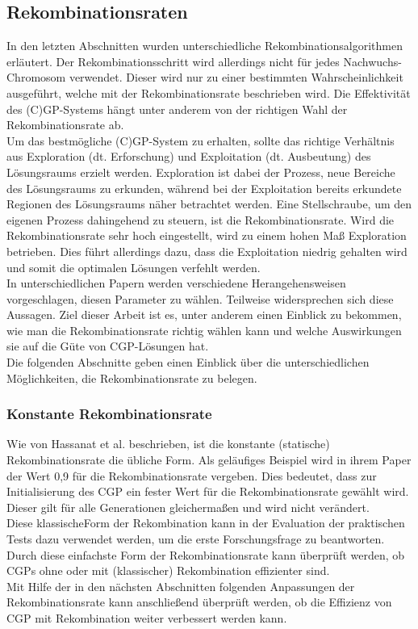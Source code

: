 \subsection{Rekombinationsraten}

In den letzten Abschnitten wurden unterschiedliche Rekombinationsalgorithmen erläutert.
Der Rekombinationsschritt wird allerdings nicht für jedes Nachwuchs-Chromosom verwendet.
Dieser wird nur zu einer bestimmten Wahrscheinlichkeit ausgeführt, welche mit der Rekombinationsrate beschrieben wird.
Die Effektivität des (C)GP-Systems hängt unter anderem von der richtigen Wahl der Rekombinationsrate ab. \cite{hassanat_choosing_2019}\\
Um das bestmögliche (C)GP-System zu erhalten, sollte das richtige Verhältnis aus Exploration (dt. Erforschung) und Exploitation (dt. Ausbeutung) des Lösungsraums erzielt werden. 
Exploration ist dabei der Prozess, neue Bereiche des Lösungsraums zu erkunden, während bei der Exploitation bereits erkundete Regionen des Lösungsraums näher betrachtet werden.
Eine Stellschraube, um den eigenen Prozess dahingehend zu steuern, ist die Rekombinationsrate. \cite{crepinsek_exploration_2013}
Wird die Rekombinationsrate sehr hoch eingestellt, wird zu einem hohen Maß Exploration betrieben. 
Dies führt allerdings dazu, dass die Exploitation niedrig gehalten wird und somit die optimalen Lösungen verfehlt werden. \cite{pavai_survey_2017}\\
In unterschiedlichen Papern werden verschiedene Herangehensweisen vorgeschlagen, diesen Parameter zu wählen.
Teilweise widersprechen sich diese Aussagen.
Ziel dieser Arbeit ist es, unter anderem einen Einblick zu bekommen, wie man die Rekombinationsrate richtig wählen kann und welche Auswirkungen sie auf die Güte von CGP-Lösungen hat.\\

Die folgenden Abschnitte geben einen Einblick über die unterschiedlichen Möglichkeiten, die Rekombinationsrate zu belegen.

\subsubsection{Konstante Rekombinationsrate}
\label{subsubsec:konstanteCrossover}

Wie von Hassanat et al. beschrieben, ist die konstante (statische) Rekombinationsrate die übliche Form. 
Als geläufiges Beispiel wird in ihrem Paper der Wert 0,9 für die Rekombinationsrate vergeben. \cite{hassanat_choosing_2019} 
Dies bedeutet, dass zur Initialisierung des CGP ein fester Wert für die Rekombinationsrate gewählt wird.
Dieser gilt für alle Generationen gleichermaßen und wird nicht verändert.\\
Diese \glqq klassische\grqq Form der Rekombination kann in der Evaluation der praktischen Tests dazu verwendet werden, um die erste Forschungsfrage zu beantworten.
Durch diese einfachste Form der Rekombinationsrate kann überprüft werden, ob CGPs ohne oder mit (klassischer) Rekombination effizienter sind.\\
Mit Hilfe der in den nächsten Abschnitten folgenden Anpassungen der Rekombinationsrate kann anschließend überprüft werden, ob die Effizienz von CGP mit Rekombination weiter verbessert werden kann.

